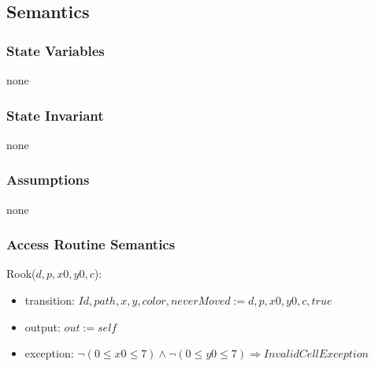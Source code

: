 \documentclass[12pt]{article}
\begin{document}
\subsection* {Semantics}

\subsubsection* {State Variables}

none

\subsubsection* {State Invariant}

none

\subsubsection* {Assumptions}

none

\subsubsection* {Access Routine Semantics}

Rook($d, p, x0, y0, c$):
\begin{itemize}
\item transition: $Id, path, x, y, color, neverMoved := d, p, x0, y0, c, true$
\item output: $out := \mathit{self}$
\item exception: $ \neg (0 \leq x0 \leq 7) \wedge  \neg (0 \leq y0 \leq 7) \Rightarrow InvalidCellException$
\end{itemize}
\end{document}
